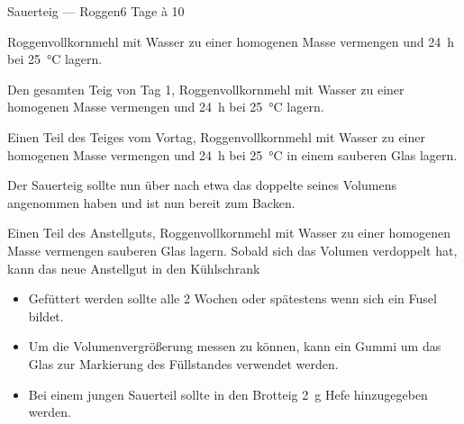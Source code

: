 \begin{MyRecipe}{Sauerteig --- Roggen}{}{6 Tage à \SI{10}{\minuteprime}}
	
	
	Roggenvollkornmehl mit Wasser zu einer homogenen Masse vermengen und \SI{24}{\hour} bei \SI{25}{\degreeCelsius} lagern.\par\bigskip
	
	
	Den gesamten Teig von Tag 1, Roggenvollkornmehl mit Wasser zu einer homogenen Masse vermengen und \SI{24}{\hour} bei \SI{25}{\degreeCelsius} lagern.\par\bigskip
	
	
	Einen Teil des Teiges vom Vortag, Roggenvollkornmehl mit Wasser zu einer homogenen Masse vermengen und \SI{24}{\hour} bei \SI{25}{\degreeCelsius} in einem sauberen Glas lagern.\par\bigskip
	
	Der Sauerteig sollte nun über nach etwa das doppelte seines Volumens angenommen haben und ist nun bereit zum Backen.\par\bigskip
	

	Einen Teil des Anstellguts, Roggenvollkornmehl mit Wasser zu einer homogenen Masse vermengen sauberen Glas lagern. Sobald sich das Volumen verdoppelt hat, kann das neue Anstellgut in den Kühlschrank\par\bigskip
	
	\begin{itemize}
		\item Gefüttert werden sollte alle 2 Wochen oder spätestens wenn sich ein Fusel bildet.
		\item Um die Volumenvergrößerung messen zu können, kann ein Gummi um das Glas zur Markierung des Füllstandes verwendet werden.
		\item Bei einem jungen Sauerteil sollte in den Brotteig \SI{2}{\gram} Hefe hinzugegeben werden.
	\end{itemize}
	
	
	
\end{MyRecipe}